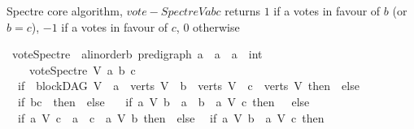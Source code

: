 \begin{isabellebody}
\begin{isamarkuptext}%
Spectre core algorithm, $vote-Spectre V a b c$ returns 
     $1$ if a votes in favour of $b$ (or $b = c$),
     $-1$ if a votes in favour of $c$, $0$ otherwise%
\end{isamarkuptext}\isamarkuptrue%
\isamarkupfalse%
\ vote{\isacharunderscore}{\kern0pt}Spectre\ {\isacharcolon}{\kern0pt}{\isacharcolon}{\kern0pt}\ {\isachardoublequoteopen}{\isacharparenleft}{\kern0pt}{\isacharprime}{\kern0pt}a{\isacharcolon}{\kern0pt}{\isacharcolon}{\kern0pt}linorder{\isacharcomma}{\kern0pt}{\isacharprime}{\kern0pt}b{\isacharparenright}{\kern0pt}\ pre{\isacharunderscore}{\kern0pt}digraph\ {\isasymRightarrow}{\isacharprime}{\kern0pt}a\ {\isasymRightarrow}\ {\isacharprime}{\kern0pt}a\ {\isasymRightarrow}\ {\isacharprime}{\kern0pt}a\ {\isasymRightarrow}\ int{\isachardoublequoteclose}\ \isanewline
\ \ \isanewline
\ \ \ \ {\isachardoublequoteopen}vote{\isacharunderscore}{\kern0pt}Spectre\ V\ a\ b\ c\ {\isacharequal}{\kern0pt}\ {\isacharparenleft}{\kern0pt}\isanewline
\ \ if\ {\isacharparenleft}{\kern0pt}{\isasymnot}\ blockDAG\ V\ {\isasymor}\ a\ {\isasymnotin}\ verts\ V\ {\isasymor}\ b\ {\isasymnotin}\ verts\ V\ {\isasymor}\ c\ {\isasymnotin}\ verts\ V{\isacharparenright}{\kern0pt}\ then\ {}\ else\ \isanewline
\ \ if\ {\isacharparenleft}{\kern0pt}b{\isacharequal}{\kern0pt}c{\isacharparenright}{\kern0pt}\ \ then\ {}\ else\ \isanewline
\ \ if\ {\isacharparenleft}{\kern0pt}{\isacharparenleft}{\kern0pt}{\isacharparenleft}{\kern0pt}a\ {\isasymrightarrow}\isactrlsup {\isacharplus}{\kern0pt}\isactrlbsub V\isactrlesub \ b{\isacharparenright}{\kern0pt}\ {\isasymor}\ a\ {\isacharequal}{\kern0pt}\ b{\isacharparenright}{\kern0pt}\ {\isasymand}\ {\isasymnot}{\isacharparenleft}{\kern0pt}a\ {\isasymrightarrow}\isactrlsup {\isacharplus}{\kern0pt}\isactrlbsub V\isactrlesub \ c{\isacharparenright}{\kern0pt}{\isacharparenright}{\kern0pt}\ then\ {}\ \ else\isanewline
\ \ if\ {\isacharparenleft}{\kern0pt}{\isacharparenleft}{\kern0pt}{\isacharparenleft}{\kern0pt}a\ {\isasymrightarrow}\isactrlsup {\isacharplus}{\kern0pt}\isactrlbsub V\isactrlesub \ c{\isacharparenright}{\kern0pt}\ {\isasymor}\ a\ {\isacharequal}{\kern0pt}\ c{\isacharparenright}{\kern0pt}\ {\isasymand}\ {\isasymnot}{\isacharparenleft}{\kern0pt}a\ {\isasymrightarrow}\isactrlsup {\isacharplus}{\kern0pt}\isactrlbsub V\isactrlesub \ b{\isacharparenright}{\kern0pt}{\isacharparenright}{\kern0pt}\ then\ {\isacharminus}{\kern0pt}{}\ else\isanewline
\ \ if\ {\isacharparenleft}{\kern0pt}{\isacharparenleft}{\kern0pt}a\ {\isasymrightarrow}\isactrlsup {\isacharplus}{\kern0pt}\isactrlbsub V\isactrlesub \ b{\isacharparenright}{\kern0pt}\ {\isasymand}\ {\isacharparenleft}{\kern0pt}a\ {\isasymrightarrow}\isactrlsup {\isacharplus}{\kern0pt}\isactrlbsub V\isactrlesub \ c{\isacharparenright}{\kern0pt}{\isacharparenright}{\kern0pt}\ then\ \isanewline

\end{isabellebody}
